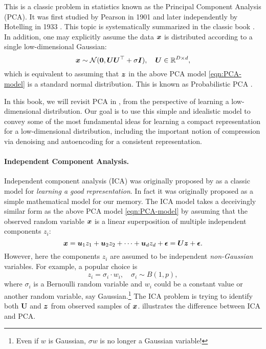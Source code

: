\documentclass[../../book-main.tex]{subfiles}
\begin{document}
This is a classic problem in statistics known as the Principal Component Analysis (PCA). It was first studied by Pearson in 1901 \cite{Pearson1901} and later independently by Hotelling in 1933 \cite{Hotelling1933}. This topic is systematically summarized in the classic book \cite{Jolliffe1986,JolliffeI2002}.
In addition, one may explicitly assume the data $\bm{x}$ is distributed according to a single low-dimensional Gaussian:
\begin{equation}
    \bm{x} \sim \mathcal{N}(\boldsymbol{0}, \boldsymbol{U}\boldsymbol{U}^\top + \sigma \bm{I}), \quad \boldsymbol{U} \in \mathbb{R}^{D\times d},
\end{equation}
which is equivalent to assuming that  $\bm{z}$ in the above PCA model \eqref{eqn:PCA-model} is a standard normal distribution. 
This is known as Probabilistic PCA \cite{TippingM1999}. 

In this book, we will revisit  PCA in , from the perspective of learning a low-dimensional distribution. Our goal is to use this simple and idealistic model to convey some of the most fundamental ideas for learning a compact representation for a low-dimensional distribution, including the important notion of compression via denoising and autoencoding for a consistent representation.

\paragraph{Independent Component Analysis.}
Independent component analysis (ICA) was originally proposed by \cite{Ans-1985} as a classic model for {\em learning a good representation}. In fact it was originally proposed as a simple mathematical model for our memory. The ICA model takes a deceivingly similar form as the above PCA model \eqref{eqn:PCA-model} by assuming that the observed random variable $\bm{x}$ is a linear superposition of multiple independent components $z_i$:
\begin{equation}
    \bm{x} = \boldsymbol{u}_1 z_1 + \boldsymbol{u}_2 z_2 + \cdots + \boldsymbol{u}_d z_d  + \boldsymbol{\epsilon} =  \boldsymbol{U} \bm{z} + \boldsymbol{\epsilon}.
    \label{eqn:ICA-model}
\end{equation}
However, here the components $z_i$ are assumed to be independent {\em non-Gaussian} variables. For example, a popular choice is
\begin{equation}
    z_i = \sigma_i \cdot w_i, \quad \sigma_i \sim B(1,p),
    \label{eqn:ICA-modes}
\end{equation}
where $\sigma_i$ is a Bernoulli random variable and $w_i$ could be a constant value or another random variable, say Gaussian.\footnote{Even if $w$ is Gaussian, $\sigma w$ is no longer a Gaussian variable!}  The ICA problem is trying to identify both $\boldsymbol{U}$ and $\bm{z}$ from observed samples of $\bm{x}$.  illustrates the difference between ICA and PCA.
\end{document}
